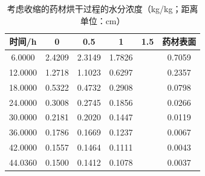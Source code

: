 \begin{table}[htbp]
  \centering
  \caption{考虑收缩的药材烘干过程的水分浓度（kg/kg；距离单位：cm）}
  \label{tab:q4-moisture}
  \begin{tabular}{cccccc}
    \toprule
    时间/h & 0 & 0.5 & 1 & 1.5 & 药材表面 \\
    \midrule
    6.0000 & 2.4209 & 2.3149 & 1.7826 &  & 0.7059 \\
    12.0000 & 1.2718 & 1.1023 & 0.6297 &  & 0.2357 \\
    18.0000 & 0.5322 & 0.4732 & 0.2908 &  & 0.0798 \\
    24.0000 & 0.3008 & 0.2745 & 0.1856 &  & 0.0266 \\
    30.0000 & 0.2181 & 0.2020 & 0.1447 &  & 0.0119 \\
    36.0000 & 0.1786 & 0.1669 & 0.1237 &  & 0.0067 \\
    42.0000 & 0.1557 & 0.1464 & 0.1111 &  & 0.0043 \\
    44.0360 & 0.1500 & 0.1412 & 0.1078 &  & 0.0037 \\
    \bottomrule
  \end{tabular}
\end{table}
